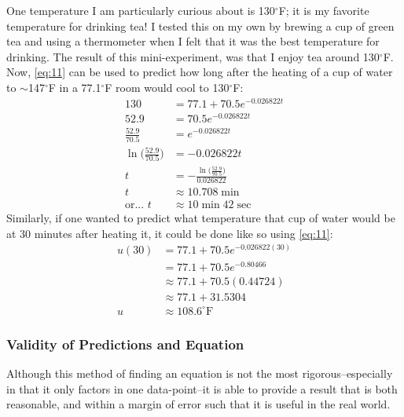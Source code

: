 \documentclass[10pt]{article}
\begin{document}
 One temperature I am particularly curious about is 130$^\circ$F; it is my favorite temperature for drinking tea! I tested this on my own by brewing a cup of green tea and using a thermometer when I felt that it was the best temperature for drinking. The result of this mini-experiment, was that I enjoy tea around 130$^\circ$F.\newpage 
Now, \eqref{eq:11} can be used to predict how long after the heating of a cup of water to $\sim$147$^\circ$F in a 77.1$^\circ$F room would cool to 130$^\circ$F:
	\begin{align*}
	130 &= 77.1+ 70.5 e^{-0.026822t}\\
	52.9 &= 70.5 e^{-0.026822t}\\
	\frac{52.9}{70.5} &= e^{-0.026822t}\\
	\ln \bigg( \frac{52.9}{70.5} \bigg) &= -0.026822t \\
	t &=   - \frac{\ln \big( \frac{52.9}{70.5} \big)    }{0.026822}  \\
	t &\approx     10.708 \min \\
	\text{or... } t &\approx     10 \min 42 \sec 
	\end{align*}
Similarly, if one wanted to predict what temperature that cup of water would be at 30 minutes after heating it, it could be done like so using \eqref{eq:11}:
	\begin{align*}
	u(30) &= 77.1+ 70.5 e^{-0.026822(30)}\\
	&= 77.1+ 70.5 e^{-0.80466}\\
	&\approx 77.1+ 70.5(0.44724)\\
	&\approx 77.1+ 31.5304\\
	u &\approx 108.6 ^\circ \text{F}
	\end{align*}
\newpage


\subsubsection{Validity of Predictions and Equation}

Although this method of finding an equation is not the most rigorous--especially in that it only factors in one data-point--it is able to provide a result that is both reasonable, and within a margin of error such that it is useful in the real world. 
\end{document}
